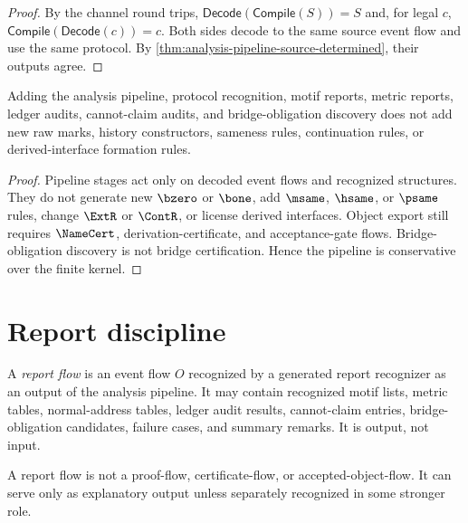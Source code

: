 \begin{proof}
By the channel round trips, $\mathsf{Decode}(\mathsf{Compile}(S))=S$ and, for legal $c$, $\mathsf{Compile}(\mathsf{Decode}(c))=c$. Both sides decode to the same source event flow and use the same protocol. By \autoref{thm:analysis-pipeline-source-determined}, their outputs agree.
\end{proof}

\begin{theorem}
\label{thm:analysis-pipeline-conservativity}
Adding the analysis pipeline, protocol recognition, motif reports, metric reports, ledger audits, cannot-claim audits, and bridge-obligation discovery does not add new raw marks, history constructors, sameness rules, continuation rules, or derived-interface formation rules.
\end{theorem}

\begin{proof}
Pipeline stages act only on decoded event flows and recognized structures. They do not generate new $\bzero$ or $\bone$, add $\msame$, $\hsame$, or $\psame$ rules, change $\ExtR$ or $\ContR$, or license derived interfaces. Object export still requires $\NameCert$, derivation-certificate, and acceptance-gate flows. Bridge-obligation discovery is not bridge certification. Hence the pipeline is conservative over the finite kernel.
\end{proof}

\section{Report discipline}
\label{sec:analysis-pipeline-report-discipline}

\begin{definition}
\label{def:analysis-pipeline-report-flow}
A \emph{report flow} is an event flow $O$ recognized by a generated report recognizer as an output of the analysis pipeline. It may contain recognized motif lists, metric tables, normal-address tables, ledger audit results, cannot-claim entries, bridge-obligation candidates, failure cases, and summary remarks. It is output, not input.
\end{definition}

\begin{principle}
\label{prin:analysis-pipeline-reports-not-evidence}
A report flow is not a proof-flow, certificate-flow, or accepted-object-flow. It can serve only as explanatory output unless separately recognized in some stronger role.
\end{principle}

